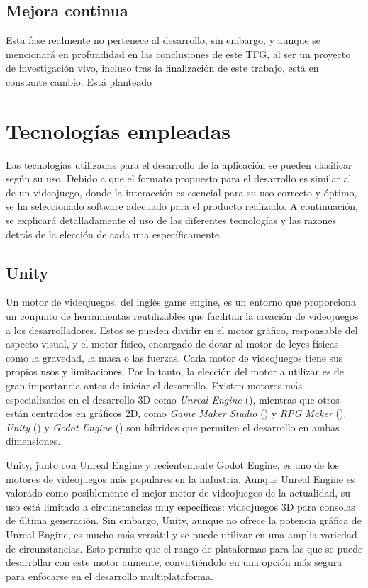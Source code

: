 \subsection{Mejora continua}

Esta fase realmente no pertenece al desarrollo, sin embargo, y aunque se mencionará en profundidad en las conclusiones de este TFG, al ser un proyecto de investigación vivo, incluso tras la finalización de este trabajo, está en constante cambio. Está planteado

\newpage

\section{Tecnologías empleadas}

Las tecnologías utilizadas para el desarrollo de la aplicación se pueden clasificar según su uso. Debido a que el formato propuesto para el desarrollo es similar al de un videojuego, donde la interacción es esencial para su uso correcto y óptimo, se ha seleccionado software adecuado para el producto realizado. A continuación, se explicará detalladamente el uso de las diferentes tecnologías y las razones detrás de la elección de cada una específicamente.

\subsection{Unity}

Un motor de videojuegos, del inglés game engine, es un entorno que proporciona un conjunto de herramientas reutilizables que facilitan la creación de videojuegos a los desarrolladores. Estos se pueden dividir en el motor gráfico, responsable del aspecto visual, y el motor físico, encargado de dotar al motor de leyes físicas como la gravedad, la masa o las fuerzas. Cada motor de videojuegos tiene sus propios usos y limitaciones. Por lo tanto, la elección del motor a utilizar es de gran importancia antes de iniciar el desarrollo. Existen motores más especializados en el desarrollo 3D como \textit{Unreal Engine} (\cite{UE:1998}), mientras que otros están centrados en gráficos 2D, como \textit{Game Maker Studio} (\cite{GMS:1999}) y \textit{RPG Maker} (\cite{RPGM:1992}). \textit{Unity} (\cite{UNITY:2005}) y \textit{Godot Engine} (\cite{GODOT:2001}) son híbridos que permiten el desarrollo en ambas dimensiones.

Unity, junto con Unreal Engine y recientemente Godot Engine, es uno de los motores de videojuegos más populares en la industria. Aunque Unreal Engine es valorado como posiblemente el mejor motor de videojuegos de la actualidad, su uso está limitado a circunstancias muy específicas: videojuegos 3D para consolas de última generación. Sin embargo, Unity, aunque no ofrece la potencia gráfica de Unreal Engine, es mucho más versátil y se puede utilizar en una amplia variedad de circunstancias. Esto permite que el rango de plataformas para las que se puede desarrollar con este motor aumente, convirtiéndolo en una opción más segura para enfocarse en el desarrollo multiplataforma.

